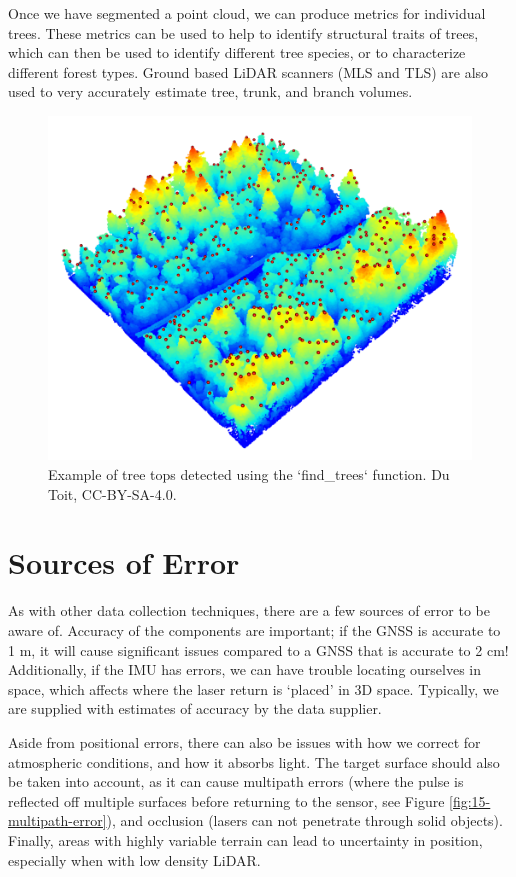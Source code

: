 \documentclass[
]{book}
\begin{document}
Once we have segmented a point cloud, we can produce metrics for individual trees. These metrics can be used to help to identify structural traits of trees, which can then be used to identify different tree species, or to characterize different forest types. Ground based LiDAR scanners (MLS and TLS) are also used to very accurately estimate tree, trunk, and branch volumes.

\begin{figure}
\includegraphics[width=0.8\linewidth]{images/15-las-treetops} \caption{Example of tree tops detected using the `find_trees` function. Du Toit, CC-BY-SA-4.0.}\label{fig:15-las-treetops}
\end{figure}

\section{Sources of Error}\label{sources-of-error-1}

As with other data collection techniques, there are a few sources of error to be aware of. Accuracy of the components are important; if the GNSS is accurate to 1 m, it will cause significant issues compared to a GNSS that is accurate to 2 cm! Additionally, if the IMU has errors, we can have trouble locating ourselves in space, which affects where the laser return is `placed' in 3D space. Typically, we are supplied with estimates of accuracy by the data supplier.

Aside from positional errors, there can also be issues with how we correct for atmospheric conditions, and how it absorbs light. The target surface should also be taken into account, as it can cause multipath errors (where the pulse is reflected off multiple surfaces before returning to the sensor, see Figure \ref{fig:15-multipath-error}), and occlusion (lasers can not penetrate through solid objects). Finally, areas with highly variable terrain can lead to uncertainty in position, especially when with low density LiDAR.
\end{document}
